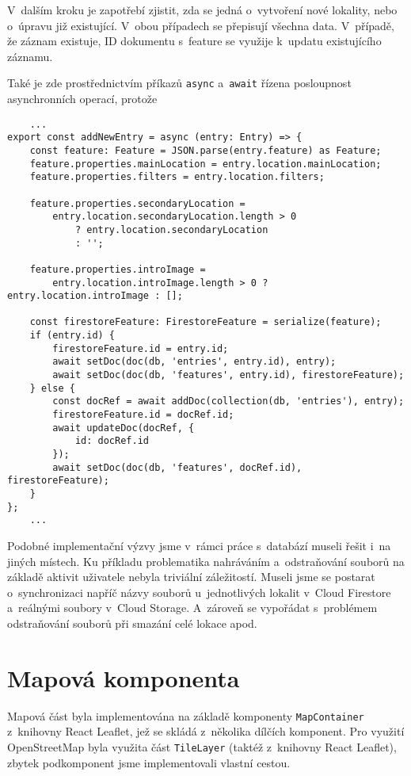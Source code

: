 V~dalším kroku je zapotřebí zjistit, zda se jedná o~vytvoření nové lokality, nebo o~úpravu již existující. V~obou případech se přepisují všechna data. V~případě, že záznam existuje, ID dokumentu s~feature se využije k~updatu existujícího záznamu.

Také je zde prostřednictvím příkazů \verb|async| a~\verb|await| řízena posloupnost asynchronních operací, protože

\begin{verbatim}
    ...
export const addNewEntry = async (entry: Entry) => {
    const feature: Feature = JSON.parse(entry.feature) as Feature;
    feature.properties.mainLocation = entry.location.mainLocation;
    feature.properties.filters = entry.location.filters;

    feature.properties.secondaryLocation =
        entry.location.secondaryLocation.length > 0
            ? entry.location.secondaryLocation
            : '';

    feature.properties.introImage =
        entry.location.introImage.length > 0 ? entry.location.introImage : [];

    const firestoreFeature: FirestoreFeature = serialize(feature);
    if (entry.id) {
        firestoreFeature.id = entry.id;
        await setDoc(doc(db, 'entries', entry.id), entry);
        await setDoc(doc(db, 'features', entry.id), firestoreFeature);
    } else {
        const docRef = await addDoc(collection(db, 'entries'), entry);
        firestoreFeature.id = docRef.id;
        await updateDoc(docRef, {
            id: docRef.id
        });
        await setDoc(doc(db, 'features', docRef.id), firestoreFeature);
    }
};
    ...
    \end{verbatim}

Podobné implementační výzvy jsme v~rámci práce s~databází museli řešit i~na jiných místech. Ku příkladu problematika nahráváním a~odstraňování souborů na základě aktivit uživatele nebyla triviální záležitostí. Museli jsme se postarat o~synchronizaci napříč názvy souborů u~jednotlivých lokalit v~Cloud Firestore a~reálnými soubory v~Cloud Storage. A~zároveň se vypořádat s~problémem odstraňování souborů při smazání celé lokace apod.

\hypertarget{mapovuxe1-komponenta}{%
\section{Mapová komponenta}\label{mapovuxe1-komponenta}}

Mapová část byla implementována na základě komponenty \verb|MapContainer| z~knihovny React Leaflet, jež se skládá z~několika dílčích komponent. Pro využití OpenStreetMap byla využita část \verb|TileLayer| (taktéž z~knihovny React Leaflet), zbytek podkomponent jsme implementovali vlastní cestou.

